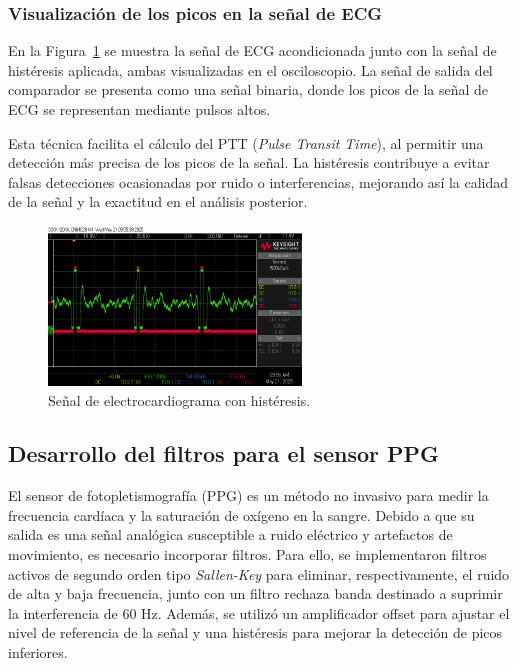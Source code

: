         \subsubsection{Visualización de los picos en la señal de ECG}

        En la Figura~\ref{fig:ECGconHisteresis} se muestra la señal de ECG acondicionada junto con la señal de histéresis aplicada, ambas visualizadas en el osciloscopio. La señal de salida del comparador se presenta como una señal binaria, donde los picos de la señal de ECG se representan mediante pulsos altos. 

        Esta técnica facilita el cálculo del PTT (\textit{Pulse Transit Time}), al permitir una detección más precisa de los picos de la señal. La histéresis contribuye a evitar falsas detecciones ocasionadas por ruido o interferencias, mejorando así la calidad de la señal y la exactitud en el análisis posterior.

        \begin{figure}[H]
            \centering
            \includegraphics[width=0.6\textwidth]{img/Desarrollo/electro_histeresis.png}
            \caption[Señal de electrocardiograma con histéresis.]{Señal de electrocardiograma con histéresis.\footnotemark}
            \label{fig:ECGconHisteresis}
        \end{figure}

    \subsection{Desarrollo del filtros para el sensor PPG}
    El sensor de fotopletismografía (PPG) es un método no invasivo para medir la frecuencia cardíaca y la saturación de oxígeno en la sangre. Debido a que su salida es una señal analógica susceptible a ruido eléctrico y artefactos de movimiento, es necesario incorporar filtros. Para ello, se implementaron filtros activos de segundo orden tipo \textit{Sallen-Key} para eliminar, respectivamente, el ruido de alta y baja frecuencia, junto con un filtro rechaza banda destinado a suprimir la interferencia de 60 Hz. Además, se utilizó un amplificador offset para ajustar el nivel de referencia de la señal y una histéresis para mejorar la detección de picos inferiores.

